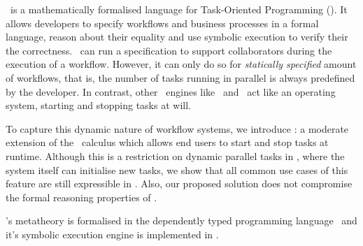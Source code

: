 %
%
\TOPHAT\ is a mathematically formalised language for Task-Oriented Programming (\TOP).
It allows developers to specify workflows and business processes in a formal language,
reason about their equality
and use symbolic execution to verify their the correctness.
\TOPHAT\ can run a specification to support collaborators during the execution of a workflow.
However, it can only do so for \emph{statically specified} amount of workflows,
that is, the number of tasks running in parallel is always predefined by the developer.
In contrast, other \TOP\ engines like \ITASKS\ and \MTASKS\ act like an operating system,
starting and stopping tasks at will.

To capture this dynamic nature of workflow systems,
we introduce \DYNTOPHAT:
a moderate extension of the \TOPHAT\ calculus which allows end users to start and stop tasks at runtime.
Although this is a restriction on dynamic parallel tasks in \ITASKS,
where the system itself can initialise new tasks,
we show that all common use cases of this feature are still expressible in \DYNTOPHAT.
Also, our proposed solution does not compromise the formal reasoning properties of \TOPHAT.

\TOPHAT's metatheory is formalised in the dependently typed programming language \IDRIS\
and it's symbolic execution engine is implemented in \HASKELL.


